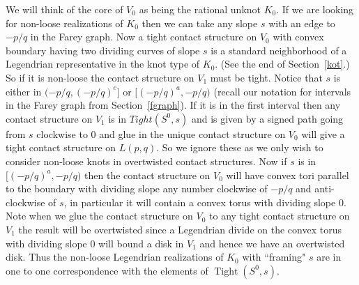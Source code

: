 \documentclass[11pt]{amsart}
\theoremstyle{plain}
\theoremstyle{definition}
\theoremstyle{remark}
\numberwithin{theorem}{section}
\DeclareMathOperator{\Tight}{Tight}
\begin{document}
We will think of the core of $V_0$ as being the rational unknot $K_0$. If we are looking for non-loose realizations of $K_0$ then we can take any slope $s$ with an edge to $-p/q$ in the Farey graph. Now a tight contact structure on $V_0$ with convex boundary having two dividing curves of slope $s$ is a standard neighborhood of a Legendrian representative in the knot type of $K_0$. (See the end of Section~\ref{kot}.) So if it is non-loose the contact structure on $V_1$ must be tight. Notice that $s$ is either in $(-p/q, (-p/q)^c]$ or $[(-p/q)^a, -p/q)$ (recall our notation for intervals in the Farey graph from Section~\ref{fgraph}). If it is in the first interval then any contact structure on $V_1$ is in $Tight(S^0,s)$ and is given by a signed path going from $s$ clockwise to $0$ and glue in the unique contact structure on $V_0$  will give a tight contact structure on $L(p,q)$. So we ignore these as we only wish to consider non-loose knots in overtwisted contact structures. Now if $s$ is in $[(-p/q)^a, -p/q)$ then the contact structure on $V_0$ will have convex tori parallel to the boundary with dividing slope any number clockwise of $-p/q$ and anti-clockwise of $s$, in particular it will contain a convex torus with dividing slope $0$. Note when we glue the contact structure on $V_0$ to any tight contact structure on $V_1$ the result will be overtwisted since a Legendrian divide on the convex torus with dividing slope $0$ will bound a disk in $V_1$ and hence we have an overtwisted disk. Thus the non-loose Legendrian realizations of $K_0$ with ``framing" $s$ are in one to one correspondence with the elements of $\Tight(S^0,s)$. 
\end{document}
